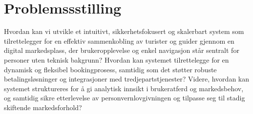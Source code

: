 \documentclass[../doc.tex]{subfiles}
\begin{document}
\section{Problemssstilling}
Hvordan kan vi utvikle et intuitivt, sikkerhetsfokusert og skalerbart system som tilrettelegger for en effektiv sammenkobling av turister og guider gjennom en digital markedsplass, der brukeropplevelse og enkel navigasjon står sentralt for personer uten teknisk bakgrunn? Hvordan kan systemet tilrettelegge for en dynamisk og fleksibel bookingprosess, samtidig som det støtter robuste betalingsløsninger og integrasjoner med tredjepartstjenester? Videre, hvordan kan systemet struktureres for å gi analytisk innsikt i brukeratferd og markedsbehov, og samtidig sikre etterlevelse av personvernlovgivningen og tilpasse seg til stadig skiftende markedsforhold?
\end{document}
